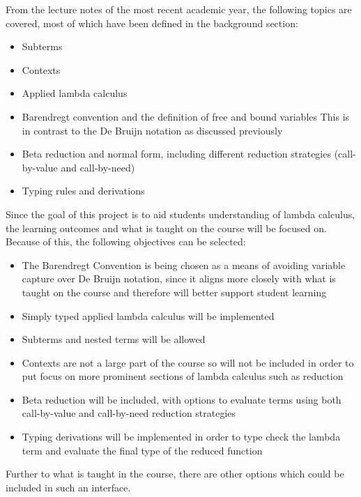 \documentclass[a4paper,12pt]{report}
\begin{document}
From the lecture notes of the most recent academic year, the following topics are covered, most of which have been defined in the background section:

\begin{itemize}
	\item Subterms
	\item Contexts
	\item Applied lambda calculus
	\item Barendregt convention and the definition of free and bound variables
	\subitem This is in contrast to the De Bruijn notation as discussed previously
	\item Beta reduction and normal form, including different reduction strategies (call-by-value and call-by-need)
	\item Typing rules and derivations
\end{itemize}

Since the goal of this project is to aid students understanding of lambda calculus, the learning outcomes and what is taught on the course will be focused on. Because of this, the following objectives can be selected:

\begin{itemize}
	\item The Barendregt Convention is being chosen as a means of avoiding variable capture over De Bruijn notation, since it aligns more closely with what is taught on the course and therefore will better support student learning
	\item Simply typed applied lambda calculus will be implemented
	\item Subterms and nested terms will be allowed
	\item Contexts are not a large part of the course so will not be included in order to put focus on more prominent sections of lambda calculus such as reduction
	\item Beta reduction will be included, with options to evaluate terms using both call-by-value and call-by-need reduction strategies
	\item Typing derivations will be implemented in order to type check the lambda term and evaluate the final type of the reduced function
\end{itemize}

Further to what is taught in the course, there are other options which could be included in such an interface.
\end{document}
